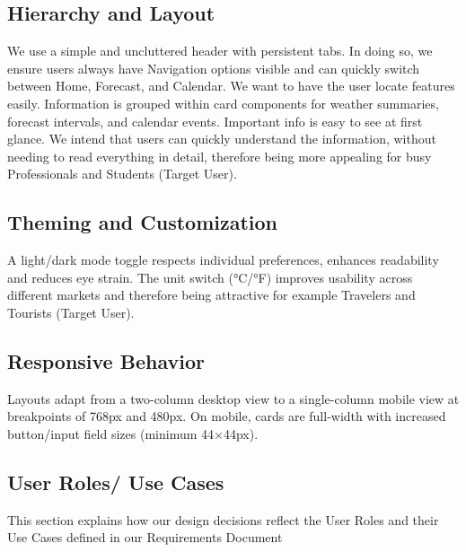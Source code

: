 \documentclass[11pt,a4paper]{article}
\begin{document}
\subsection{Hierarchy and Layout}
We use a simple and uncluttered header with persistent tabs. In doing so, we ensure users always have Navigation options visible and can quickly switch between Home, Forecast, and Calendar. We want to have the user locate features easily. Information is grouped within card components for weather summaries, forecast intervals, and calendar events. Important info is easy to see at first glance. We intend that users can quickly understand the information, without needing to read everything in detail, therefore being more appealing for busy Professionals and Students (Target User).
\subsection{Theming and Customization}
A light/dark mode toggle respects individual preferences, enhances readability and reduces eye strain. The unit switch (°C/°F) improves usability across different markets and therefore being attractive for example Travelers and Tourists (Target User).
\subsection{Responsive Behavior}
Layouts adapt from a two-column desktop view to a single-column mobile view at breakpoints of 768px and 480px. On mobile, cards are full-width with increased button/input field sizes (minimum 44×44px).

\newpage

\subsection{User Roles/ Use Cases}
This section explains how our design decisions reflect the User Roles and their Use Cases defined in our Requirements Document
\end{document}
